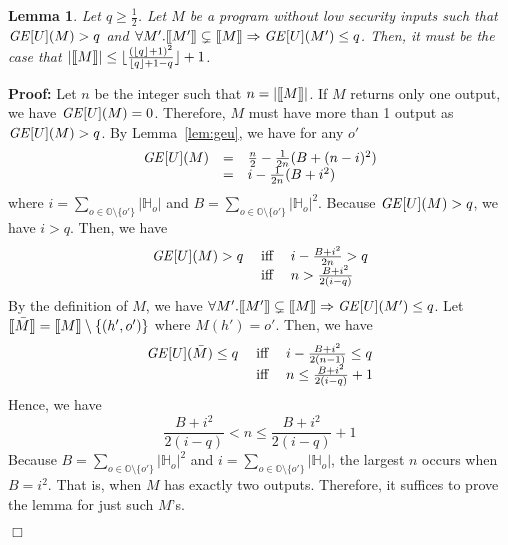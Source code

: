 \documentclass{llncs}
\newtheorem{lemma}[theorem]{Lemma}
\newenvironment{proof}{\noindent\rm{\bf Proof:}}{\hbox{$\Box$}\vspace*{0.2\baselineskip}}
\newcommand{\aset}[1]{\{{#1}\}}
\newcommand{\sembrack}[1]{[\hspace*{-1.2pt}[#1]\hspace*{-1.2pt}]}
\begin{document}
\begin{lemma}
Let $q\ge\frac{1}{2}$.  Let $M$ be a program without low security
inputs such that ${\it GE}[U](M)>q$ and $\forall
M'.\sembrack{M'}\subsetneq\sembrack{M}\Rightarrow {\it GE}[U](M')\le
q$.  Then, it must be the case that $|\sembrack{M}|\le\lfloor
\frac{(\lfloor q\rfloor +1)^2}{\lfloor q\rfloor +1 -q}\rfloor +1$.
\label{lem:gemax}
\end{lemma}
\begin{proof}
  Let $n$ be the integer such that $n=|\sembrack{M}|$.  If $M$ returns
  only one output, we have ${\it GE}[U](M)=0$.  Therefore, $M$ must
  have more than 1 output as ${\it GE}[U](M)>q$.  By
  Lemma~\ref{lem:geu}, we have for any $o'$
\[
\begin{array}{rcl}
{\it GE}[U](M)&=&\frac{n}{2}-\frac{1}{2n}(B+(n-i)^2)\\
&=&i-\frac{1}{2n}(B+i^2)
\end{array}
\]
where $i=\sum_{o\in\mathbb{O}\setminus\aset{o'}}|\mathbb{H}_o|$ and
$B=\sum_{o\in\mathbb{O}\setminus\aset{o'}}|\mathbb{H}_o|^2$.  Because
${\it GE}[U](M)>q$, we have $i>q$.  Then, we have
\[
\begin{array}{rcl}
{\it GE}[U](M)> q&\;\textrm{iff}\;&i-\frac{B+i^2}{2n}> q\\
&\;\textrm{iff}\;&n>\frac{B+i^2}{2(i-q)}
\end{array}
\]
By the definition of $M$, we have $\forall
M'.\sembrack{M'}\subsetneq\sembrack{M}\Rightarrow {\it GE}[U](M')\le
q$.  Let $\sembrack{\bar{M}}=\sembrack{M}\setminus \aset{(h',o')}$
where $M(h')=o'$.  Then, we have
\[
\begin{array}{rcl}
{\it GE}[U](\bar{M})\le q\;&\textrm{iff}&\;i-\frac{B+i^2}{2(n-1)}\le q\\
&\textrm{iff}&\;n\le\frac{B+i^2}{2(i-q)}+1
\end{array}
\]
Hence, we have
\[
\frac{B+i^2}{2(i-q)}< n\le\frac{B+i^2}{2(i-q)}+1
\]
Because $B=\sum_{o\in\mathbb{O}\setminus\aset{o'}}|\mathbb{H}_o|^2$
and $i=\sum_{o\in\mathbb{O}\setminus\aset{o'}}|\mathbb{H}_o|$, the
largest $n$ occurs when $B=i^2$.  That is, when $M$ has exactly two
outputs.  Therefore, it suffices to prove the lemma for just such
$M$'s.


\end{proof}
\end{document}
